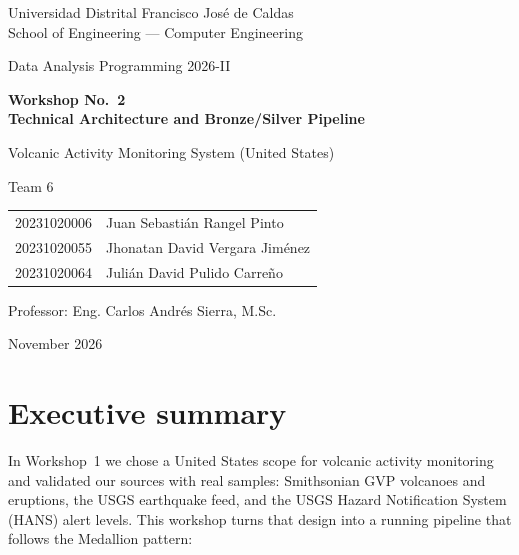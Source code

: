\documentclass[11pt,a4paper]{article}
\begin{document}
\begin{titlepage}
\centering
{\large Universidad Distrital Francisco José de Caldas\\ School of Engineering --- Computer Engineering\par}
\vspace{1.2cm}
{\Large Data Analysis Programming 2026-II\par}
\vspace{1.5cm}
{\huge\bfseries Workshop No.~2\\[4pt] Technical Architecture and Bronze/Silver Pipeline\par}
\vspace{0.8cm}
{\Large Volcanic Activity Monitoring System (United States)\par}
\vspace{1.5cm}
{\large Team 6\par}
\vspace{0.4cm}
\begin{tabular}{ll}
20231020006 & Juan Sebastián Rangel Pinto\\
20231020055 & Jhonatan David Vergara Jiménez\\
20231020064 & Julián David Pulido Carreño\\
\end{tabular}
\vfill
{\large Professor: Eng. Carlos Andrés Sierra, M.Sc.\par}
\vspace{0.3cm}
{\large November 2026\par}
\end{titlepage}

\tableofcontents
\newpage

\section{Executive summary}

In Workshop~1 we chose a United States scope for volcanic activity monitoring and validated our sources with real samples: Smithsonian GVP volcanoes and eruptions, the USGS earthquake feed, and the USGS Hazard Notification System (HANS) alert levels. This workshop turns that design into a running pipeline that follows the Medallion pattern:
\end{document}
